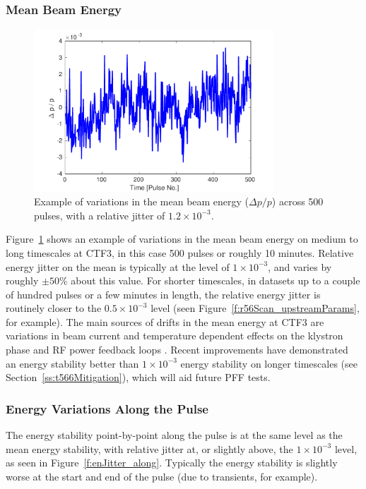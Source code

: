 \subsubsection{Mean Beam Energy}

\begin{figure}
  \centering
  \includegraphics[width=0.8\textwidth]{Figures/propagation/enJitter_mean}
  \caption{Example of variations in the mean beam energy (\(\Delta p/p\)) across 500 pulses, with a relative jitter of \(1.2\times 10^{-3}\).}
  \label{f:enJitter_mean}
\end{figure}

Figure~\ref{f:enJitter_mean} shows an example of variations in the mean beam energy on medium to long timescales at CTF3, in this case 500 pulses or roughly 10 minutes. Relative energy jitter on the mean is typically at the level of \(1 \times 10^{-3}\), and varies by roughly \(\pm50\%\) about this value. For shorter timescales, in datasets up to a couple of hundred pulses or a few minutes in length, the relative energy jitter is routinely closer to the \(0.5 \times 10^{-3}\) level (seen Figure~\ref{f:r56Scan_upstreamParams}, for example). The main sources of drifts in the mean energy at CTF3 are variations in beam current and temperature dependent effects on the klystron phase and RF power feedback loops \cite{lukasIPAC16}. Recent improvements have demonstrated an energy stability better than \(1 \times 10^{-3}\) energy stability on longer timescales (see Section~\ref{ss:t566Mitigation}), which will aid future PFF tests.

\subsubsection{Energy Variations Along the Pulse}

The energy stability point-by-point along the pulse is at the same level as the mean energy stability, with relative jitter at, or slightly above, the \(1 \times 10^{-3}\) level, as seen in Figure~\ref{f:enJitter_along}. Typically the energy stability is slightly worse at the start and end of the pulse (due to transients, for example).

